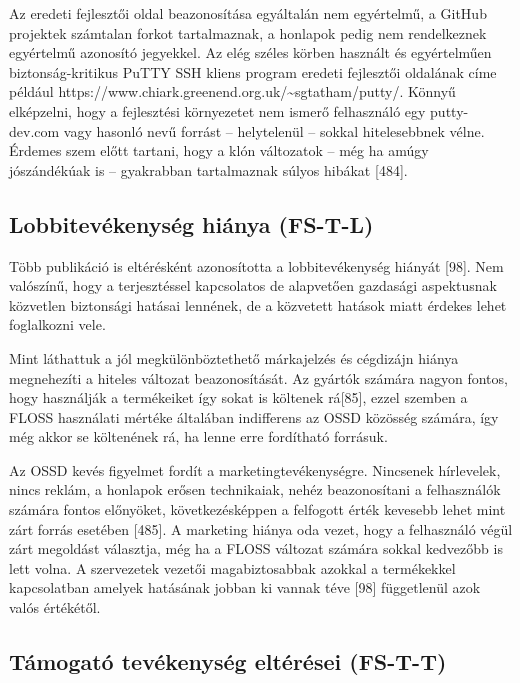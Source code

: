 \documentclass[12pt,magyar,a4paper,oneside]{scrreprt}
\begin{document}
Az eredeti fejlesztői oldal beazonosítása egyáltalán nem egyértelmű, a
GitHub projektek számtalan forkot tartalmaznak, a honlapok pedig nem
rendelkeznek egyértelmű azonosító jegyekkel. Az elég széles körben
használt és egyértelműen biztonság-kritikus PuTTY SSH kliens program
eredeti fejlesztői oldalának címe például
https://www.chiark.greenend.org.uk/\textasciitilde sgtatham/putty/.
Könnyű elképzelni, hogy a fejlesztési környezetet nem ismerő felhasználó
egy putty-dev.com vagy hasonló nevű forrást -- helytelenül -- sokkal
hitelesebbnek vélne. Érdemes szem előtt tartani, hogy a klón változatok
-- még ha amúgy jószándékúak is -- gyakrabban tartalmaznak súlyos
hibákat {[}484{]}.

\hypertarget{sec:FS-T-L}{%
\subsection{Lobbitevékenység hiánya (FS-T-L)}\label{sec:FS-T-L}}

Több publikáció is eltérésként azonosította a lobbitevékenység hiányát
{[}98{]}. Nem valószínű, hogy a terjesztéssel kapcsolatos de alapvetően
gazdasági aspektusnak közvetlen biztonsági hatásai lennének, de a
közvetett hatások miatt érdekes lehet foglalkozni vele.

Mint láthattuk a jól megkülönböztethető márkajelzés és cégdizájn hiánya
megnehezíti a hiteles változat beazonosítását. Az gyártók számára nagyon
fontos, hogy használják a termékeiket így sokat is költenek rá{[}85{]},
ezzel szemben a FLOSS használati mértéke általában indifferens az OSSD
közösség számára, így még akkor se költenének rá, ha lenne erre
fordítható forrásuk.

Az OSSD kevés figyelmet fordít a marketingtevékenységre. Nincsenek
hírlevelek, nincs reklám, a honlapok erősen technikaiak, nehéz
beazonosítani a felhasználók számára fontos előnyöket, következésképpen
a felfogott érték kevesebb lehet mint zárt forrás esetében {[}485{]}. A
marketing hiánya oda vezet, hogy a felhasználó végül zárt megoldást
választja, még ha a FLOSS változat számára sokkal kedvezőbb is lett
volna. A szervezetek vezetői magabiztosabbak azokkal a termékekkel
kapcsolatban amelyek hatásának jobban ki vannak téve {[}98{]}
függetlenül azok valós értékétől.

\hypertarget{sec:FS-T-T}{%
\subsection{Támogató tevékenység eltérései (FS-T-T)}\label{sec:FS-T-T}}
\end{document}
